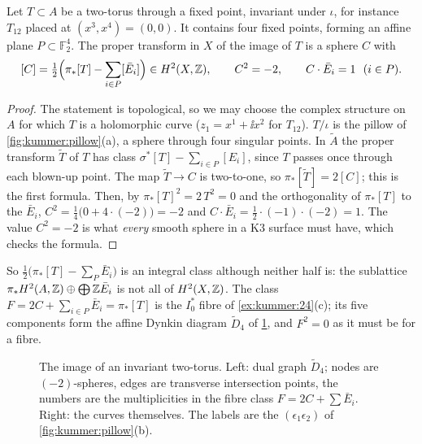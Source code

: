 \begin{lemma}\label{lem:kummer:C}
Let $T\subset A$ be a two-torus through a fixed point, invariant under $\iota$, for instance
$T_{12}$ placed at $(x^3,x^4)=(0,0)$. It contains four fixed points, forming an affine plane
$P\subset\mathbb{F}_2^4$. The proper transform in $X$ of the image of $T$ is a sphere $C$
with
\begin{equation}\label{eq:kummer:C}
  [C]=\tfrac12\Bigl(\pi_*[T]-\sum_{i\in P}[\bar E_i]\Bigr)\in H^2(X,\mathbb{Z}),\qquad
  C^2=-2,\qquad C\cdot\bar E_i=1\ \ (i\in P).
\end{equation}
\end{lemma}
\begin{proof}
The statement is topological, so we may choose the complex structure on $A$ for which $T$ is
a holomorphic curve ($z_1=x^1+\ii x^2$ for $T_{12}$). $T/\iota$ is the pillow of \cref{fig:kummer:pillow}(a), a sphere through four singular
points. In $\tilde A$ the proper transform $\tilde T$ of $T$ has class
$\sigma^*[T]-\sum_{i\in P}[E_i]$, since $T$ passes once through each blown-up point. The map
$\tilde T\to C$ is two-to-one, so $\pi_*[\tilde T]=2[C]$; this is the first formula. Then, by
$\pi_*[T]^2=2\,T^2=0$ and the orthogonality of $\pi_*[T]$ to the $\bar E_i$,
$C^2=\frac14\bigl(0+4\cdot(-2)\bigr)=-2$ and
$C\cdot\bar E_i=\frac12\cdot(-1)\cdot(-2)=1$. The value $C^2=-2$ is what \emph{every} smooth
sphere in a K3 surface must have, which checks the formula.
\end{proof}

So $\frac12\bigl(\pi_*[T]-\sum_P\bar E_i\bigr)$ is an integral class although neither half is:
the sublattice $\pi_*H^2(A,\mathbb{Z})\oplus\bigoplus\mathbb{Z}\bar E_i$ is not all of $H^2(X,\mathbb{Z})$. The class
$F=2C+\sum_{i\in P}\bar E_i=\pi_*[T]$ is the $I_0^*$ fibre of \cref{ex:kummer:24}(c); its five
components form the affine Dynkin diagram $\tilde D_4$ of \cref{fig:kummer:D4}, and
$F^2=0$ as it must be for a fibre.

\begin{figure}[t]
\centering
{}
\caption{The image of an invariant two-torus. Left: dual graph $\tilde D_4$; nodes are
$(-2)$-spheres, edges are transverse intersection points, the numbers are the multiplicities
in the fibre class $F=2C+\sum\bar E_i$. Right: the curves themselves. The labels are the
$(\epsilon_1\epsilon_2)$ of \cref{fig:kummer:pillow}(b).}\label{fig:kummer:D4}
\end{figure}

